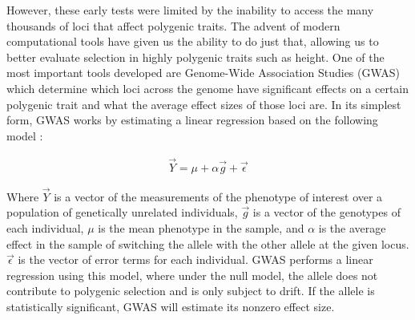\documentclass[a4paper,12pt]{article}
\begin{document}
However, these early tests were limited by the inability to access the
many thousands of loci that affect polygenic traits. The advent of
modern computational tools have given us the ability to do just that,
allowing us to better evaluate
selection in highly polygenic traits such as height. One of the most
important tools developed are Genome-Wide Association Studies (GWAS)
which determine which loci across the genome have significant effects
on a certain polygenic trait \cite{gwasoverview} and what the average
effect sizes of those loci are. In its simplest form, GWAS works by
estimating a linear regression based on the following model \cite{gwas}:

  \begin{align}
    \vec{Y} = \mu + \alpha \vec{g} + \vec{\epsilon}
  \end{align}

Where $\vec{Y}$ is a vector of the measurements of the phenotype of
interest over a population of genetically unrelated individuals,
$\vec{g}$ is a vector of the genotypes of each individual, $\mu$ is
the mean phenotype in the sample, and $\alpha$ is the average
effect in the sample of switching the allele with the
other allele at the given locus. $\vec{\epsilon}$ is the vector of
error terms for each individual. GWAS performs a linear regression
using this model, where under the null model, the
allele does not contribute to polygenic selection and is only subject
to drift. If the allele is statistically significant, GWAS will
estimate its nonzero effect size. 

\end{document}
